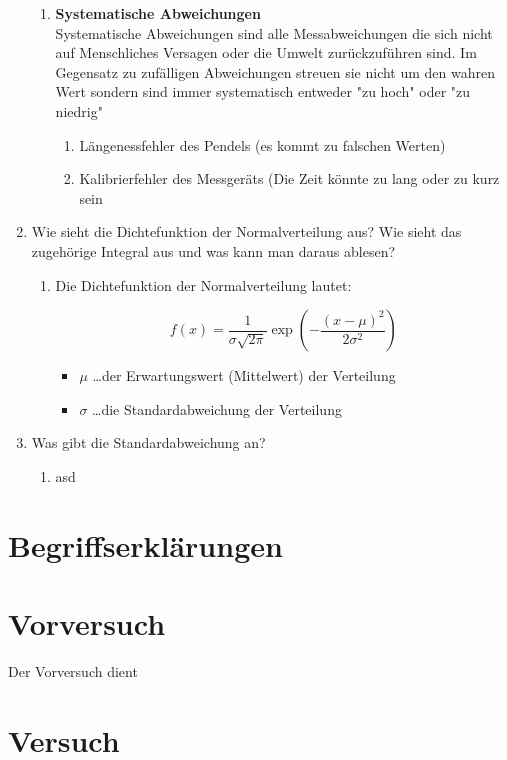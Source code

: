 \documentclass[fleqn,10pt]{olplainarticle}
\begin{document}
\begin{enumerate}
\begin{enumerate}
        \item \textbf{Systematische Abweichungen} \cite{FATU} \\
            Systematische Abweichungen sind alle Messabweichungen die sich nicht auf Menschliches Versagen oder die Umwelt zurückzuführen sind. Im Gegensatz zu zufälligen Abweichungen streuen sie nicht um den wahren Wert sondern sind immer systematisch entweder "zu hoch" oder "zu niedrig"  
            \begin{enumerate}
                \item Längenessfehler des Pendels (es kommt zu falschen Werten)
                \item Kalibrierfehler des Messgeräts (Die Zeit könnte zu lang oder zu kurz sein
            \end{enumerate}
    \end{enumerate}
     \item Wie sieht die Dichtefunktion der Normalverteilung aus? Wie sieht das zugehörige Integral aus und was kann man daraus ablesen? 
     \begin{enumerate}
         \item Die Dichtefunktion der Normalverteilung lautet:
                
                \[
                f(x) = \frac{1}{\sigma \sqrt{2\pi}} \exp \left( - \frac{(x - \mu)^2}{2\sigma^2} \right)
                \]
                    \begin{itemize}
        \item \( \mu \) \dots der Erwartungswert (Mittelwert) der Verteilung
        \item \( \sigma \) \dots die Standardabweichung der Verteilung 
    \end{itemize}
     \end{enumerate}
     



     \item Was gibt die Standardabweichung an?  
     \begin{enumerate}
         \item asd
     \end{enumerate}
 \end{enumerate}

\section{Begriffserklärungen}


\section{Vorversuch}
Der Vorversuch dient 

\section{Versuch}

\end{document}
